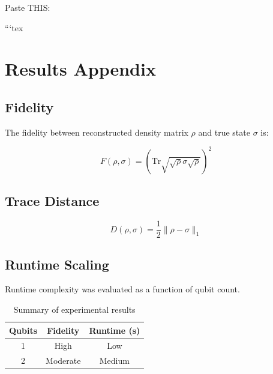 
Paste THIS:

```tex
\section{Results Appendix}

\subsection{Fidelity}
The fidelity between reconstructed density matrix $\rho$ and true state $\sigma$ is:

\begin{equation}
F(\rho,\sigma)=\left(\mathrm{Tr}\sqrt{\sqrt{\rho}\sigma\sqrt{\rho}}\right)^2
\end{equation}

\subsection{Trace Distance}
\begin{equation}
D(\rho,\sigma)=\frac{1}{2}\|\rho-\sigma\|_1
\end{equation}

\subsection{Runtime Scaling}
Runtime complexity was evaluated as a function of qubit count.

\begin{table}[h]
\centering
\begin{tabular}{c|c|c}
Qubits & Fidelity & Runtime (s) \\
\hline
1 & High & Low \\
2 & Moderate & Medium \\
\end{tabular}
\caption{Summary of experimental results}
\end{table}
